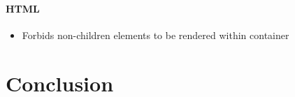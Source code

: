 \documentclass{paper}
\begin{document}
\paragraph{HTML}
\begin{itemize}
  \item Forbids non-children elements to be rendered within container
\end{itemize}


\section{Conclusion}

\subsection{}
\subsubsection{}

\paragraph{}
\subparagraph{}
\end{document}
